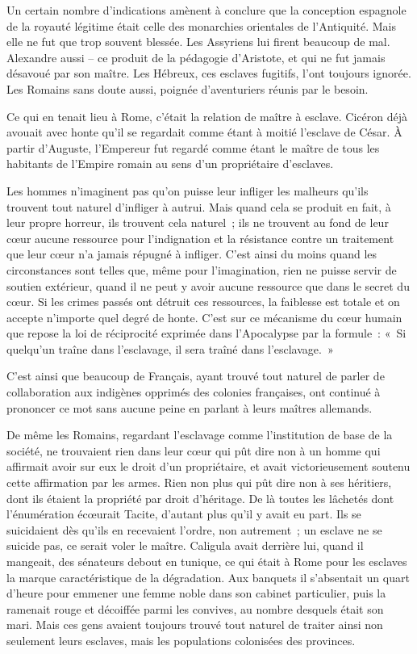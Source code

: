 \documentclass[french,twoside]{book} %
\begin{document}
Un certain nombre d'indications amènent à conclure que la conception espagnole de la royauté légitime était celle des monarchies orientales de l'Antiquité. Mais elle ne fut que trop souvent blessée. Les Assyriens lui firent beaucoup de mal. Alexandre aussi – ce produit de la pédagogie d'Aristote, et qui ne fut jamais désavoué par son maître. Les Hébreux, ces esclaves fugitifs, l'ont toujours ignorée. Les Romains sans doute aussi, poignée d'aventuriers réunis par le besoin.\par
Ce qui en tenait lieu à Rome, c'était la relation de maître à esclave. Cicéron déjà avouait avec honte qu'il se regardait comme étant à moitié l'esclave de César. À partir d'Auguste, l'Empereur fut regardé comme étant le maître de tous les habitants de l'Empire romain au sens d'un propriétaire d'esclaves.\par
Les hommes n'imaginent pas qu'on puisse leur infliger les malheurs qu'ils trouvent tout naturel d'infliger à autrui. Mais quand cela se produit en fait, à leur propre horreur, ils trouvent cela naturel ; ils ne trouvent au fond de leur cœur aucune ressource pour l'indignation et la résistance contre un traitement que leur cœur n'a jamais répugné à infliger. C'est ainsi du moins quand les circonstances sont telles que, même pour l'imagination, rien ne puisse servir de soutien extérieur, quand il ne peut y avoir aucune ressource que dans le secret du cœur. Si les crimes passés ont détruit ces ressources, la faiblesse est totale et on accepte n'importe quel degré de honte. C'est sur ce mécanisme du cœur humain que repose la loi de réciprocité exprimée dans l'Apocalypse par la formule : « Si quelqu'un traîne dans l'esclavage, il sera traîné dans l'esclavage. »\par
C'est ainsi que beaucoup de Français, ayant trouvé tout naturel de parler de collaboration aux indigènes opprimés des colonies françaises, ont continué à prononcer ce mot sans aucune peine en parlant à leurs maîtres allemands.\par
De même les Romains, regardant l'esclavage comme l'institution de base de la société, ne trouvaient rien dans leur cœur qui pût dire non à un homme qui affirmait avoir sur eux le droit d'un propriétaire, et avait victorieusement soutenu cette affirmation par les armes. Rien non plus qui pût dire non à ses héritiers, dont ils étaient la propriété par droit d'héritage. De là toutes les lâchetés dont l'énumération écœurait Tacite, d'autant plus qu'il y avait eu part. Ils se suicidaient dès qu'ils en recevaient l'ordre, non autrement ; un esclave ne se suicide pas, ce serait voler le maître. Caligula avait derrière lui, quand il mangeait, des sénateurs debout en tunique, ce qui était à Rome pour les esclaves la marque caractéristique de la dégradation. Aux banquets il s'absentait un quart d'heure pour emmener une femme noble dans son cabinet particulier, puis la ramenait rouge et décoiffée parmi les convives, au nombre desquels était son mari. Mais ces gens avaient toujours trouvé tout naturel de traiter ainsi non seulement leurs esclaves, mais les populations colonisées des provinces.\par
\end{document}
